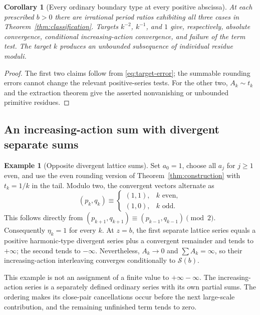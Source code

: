 \documentclass[11pt,a4paper]{article}
\numberwithin{equation}{section}
\newtheorem{corollary}[theorem]{Corollary}
\theoremstyle{definition}
\newtheorem{example}[theorem]{Example}
\theoremstyle{remark}
\newcommand{\Ssum}{\mathcal S}
\begin{document}
\begin{corollary}[Every ordinary boundary type at every positive abscissa]
\label{cor:types}
At each prescribed $b>0$ there are irrational period ratios exhibiting
all three cases in Theorem~\ref{thm:classification}. Targets $k^{-2}$,
$k^{-1}$, and $1$ give, respectively, absolute convergence, conditional
increasing-action convergence, and failure of the term test. The target
$k$ produces an unbounded subsequence of individual residue moduli.
\end{corollary}
\begin{proof}
The first two claims follow from \eqref{eq:target-error}; the summable
rounding errors cannot change the relevant positive-series tests.
For the other two, $A_k\sim t_k$ and the extraction theorem give the
asserted nonvanishing or unbounded primitive residues.
\end{proof}

\subsection{An increasing-action sum with divergent separate sums}

\begin{example}[Opposite divergent lattice sums]
\label{ex:opposite}
Set $a_0=1$, choose all $a_j$ for $j\ge1$ even, and use the even
rounding version of Theorem~\ref{thm:construction} with $t_k=1/k$ in
the tail. Modulo two, the convergent vectors alternate as
\[
 (p_k,q_k)\equiv
 \begin{cases}(1,1),&k\text{ even},\\(1,0),&k\text{ odd}.
 \end{cases}
\]
This follows directly from
$(p_{k+1},q_{k+1})\equiv(p_{k-1},q_{k-1})\pmod2$.
Consequently $\eta_k=1$ for every $k$. At $z=b$, the first separate
lattice series equals a positive harmonic-type divergent series plus
a convergent remainder and tends to $+\infty$; the second tends to
$-\infty$. Nevertheless, $A_k\to0$ and $\sum A_k=\infty$, so their
increasing-action interleaving converges conditionally to $\Ssum(b)$.
\end{example}

This example is not an assignment of a finite value to
$+\infty-\infty$. The increasing-action series is a separately defined
ordinary series with its own partial sums. The ordering makes its
close-pair cancellations occur before the next large-scale contribution,
and the remaining unfinished term tends to zero.
\end{document}
